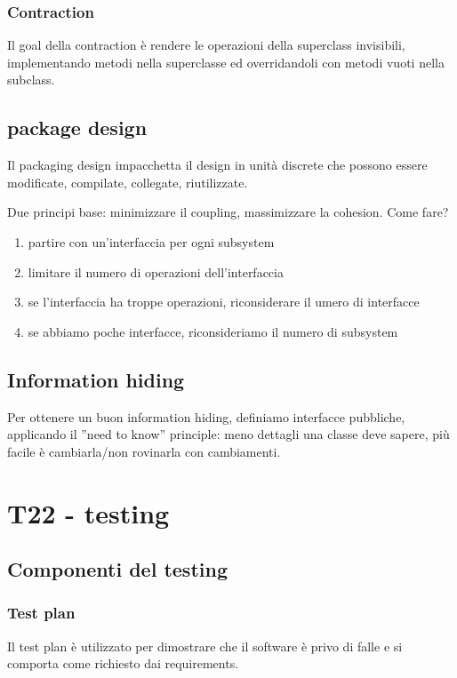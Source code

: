 \documentclass{article}
\begin{document}
\subsubsection{Contraction}
Il goal della contraction è rendere le operazioni della superclass invisibili, implementando
metodi nella superclasse ed overridandoli con metodi vuoti nella subclass.

\subsection{package design}
Il packaging design impacchetta il design in unità discrete che possono essere modificate, compilate,
collegate, riutilizzate.

Due principi base: minimizzare il coupling,
massimizzare la cohesion. Come fare?
\begin{enumerate}
    \item partire con un'interfaccia per ogni subsystem
    \item limitare il numero di operazioni dell'interfaccia
    \item se l'interfaccia ha troppe operazioni, riconsiderare il umero di interfacce
    \item se abbiamo poche interfacce, riconsideriamo il numero di subsystem
\end{enumerate}

\subsection{Information hiding}
Per ottenere un buon information hiding, definiamo interfacce pubbliche, applicando il ”need to know”
principle: meno dettagli una classe deve sapere, più facile è cambiarla/non rovinarla con cambiamenti.





\setcounter{section}{21}
\section{T22 - testing}


\subsection{Componenti del testing}
\subsubsection{Test plan}
Il test plan è utilizzato per dimostrare che il software è privo di falle e si comporta come richiesto dai
requirements.
\end{document}
